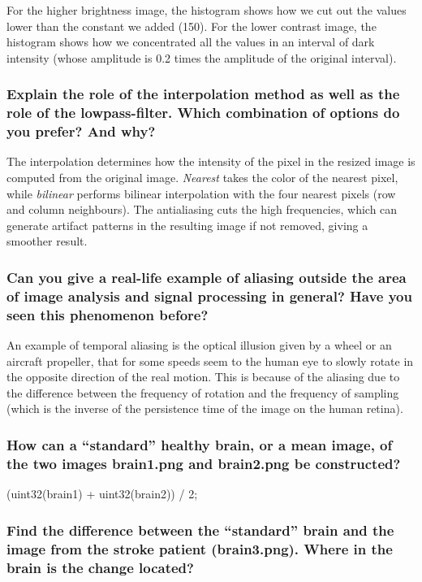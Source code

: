 \documentclass[a4paper]{article}
\begin{document}
For the higher brightness image, the histogram shows how we cut out the values
lower than the constant we added (150). For the lower contrast image, the
histogram shows how we concentrated all the values in an interval of dark
intensity (whose amplitude is 0.2 times the amplitude of the original interval).


\subsubsection*{Explain the role of the interpolation method as well as the role 
    of the lowpass-filter. Which combination of options do you prefer? And
    why?}

The interpolation determines how the intensity of the pixel in the resized
image is computed from the original image. {\em Nearest} takes the color of the
nearest pixel, while {\em bilinear} performs bilinear interpolation with the four
nearest pixels (row and column neighbours). The antialiasing cuts the high
frequencies, which can generate artifact patterns in the resulting image if
not removed, giving a smoother result.

\subsubsection*{Can you give a real-life example of aliasing outside the area of 
    image analysis and signal processing in general? Have you seen this
    phenomenon before?}

An example of temporal aliasing is the optical illusion given by a wheel or an
aircraft propeller, that for some speeds seem to the human eye to slowly
rotate in the opposite direction of the real motion. This is because of the
aliasing due to the difference between the frequency of rotation and the
frequency of sampling (which is the inverse of the persistence time
of the image on the human retina).


\subsubsection*{How can a “standard” healthy brain, or a mean image, of the two
    images brain1.png and brain2.png be constructed?}

(uint32(brain1) + uint32(brain2)) / 2;

\subsubsection*{Find the difference between the “standard” brain and the image
    from the stroke patient (brain3.png). Where in the brain is the change
    located?}
\end{document}
